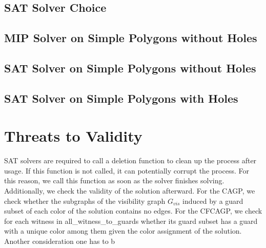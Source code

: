 \subsection{SAT Solver Choice}

\subsection{MIP Solver on Simple Polygons without Holes}

\subsection{SAT Solver on Simple Polygons without Holes}

\subsection{SAT Solver on Simple Polygons with Holes}

\section{Threats to Validity}
SAT solvers are required to call a deletion function to clean up the process after usage. If this function is not called, it can potentially corrupt the process. For this reason, we call this function as soon as the solver finishes solving. Additionally, we check the validity of the solution afterward. For the CAGP, we check whether the subgraphs of the visibility graph $G_{vis}$ induced by a guard subset of each color of the solution contains no edges. For the CFCAGP, we check for each witness in all\_witness\_to\_guards whether its guard subset has a guard with a unique color among them given the color assignment of the solution.\\
Another consideration one has to b